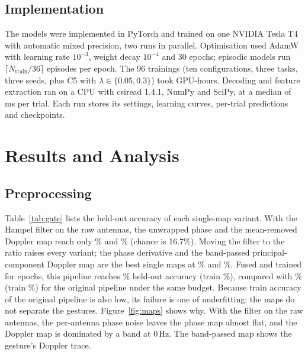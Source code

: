 \documentclass[conference]{IEEEtran}
\begin{document}
\subsection{Implementation}
The models were implemented in PyTorch \cite{paszke2019pytorch} \TorchVersion{} and trained on one NVIDIA Tesla T4 with automatic mixed precision, two runs in parallel. Optimisation used AdamW \cite{loshchilov2019adamw} with learning rate $10^{-3}$, weight decay $10^{-4}$ and 30 epochs; episodic models run $\lceil N_{\mathrm{train}}/36\rceil$ episodes per epoch. The 96 trainings (ten configurations, three tasks, three seeds, plus C5 with $\lambda\in\{0.05,0.3\}$) took \TrainHours{} GPU-hours. Decoding and feature extraction ran on a CPU with csiread 1.4.1, NumPy and SciPy, at a median of \FeatMs\,ms per trial. Each run stores its settings, learning curves, per-trial predictions and checkpoints.

\section{Results and Analysis}\label{sec:results}
\subsection{Preprocessing}
Table~\ref{tab:gate} lists the held-out accuracy of each single-map variant. With the Hampel filter on the raw antennas, the unwrapped phase and the mean-removed Doppler map reach only \GateUnwrapAnt\% and \GateDopOrigAnt\% (chance is 16.7\%). Moving the filter to the ratio raises every variant; the phase derivative and the band-passed principal-component Doppler map are the best single maps at \GateDiffRatio\% and \GateDopLockedRatio\%. Fused and trained for \GateEpochs{} epochs, this pipeline reaches \GateLocked\% held-out accuracy (train \GateLockedTrain\%), compared with \GateOrig\% (train \GateOrigTrain\%) for the original pipeline under the same budget. Because train accuracy of the original pipeline is also low, its failure is one of underfitting: the maps do not separate the gestures. Figure~\ref{fig:maps} shows why. With the filter on the raw antennas, the per-antenna phase noise leaves the phase map almost flat, and the Doppler map is dominated by a band at 0\,Hz. The band-passed map shows the gesture's Doppler trace.

\begin{table}[t]
\centering
\caption{Held-out accuracy (\%) of single-map ERM classifiers on orientations 2 and 4 (15 epochs). Bold: selected maps.}
\label{tab:gate}
\footnotesize

\end{table}
\end{document}
